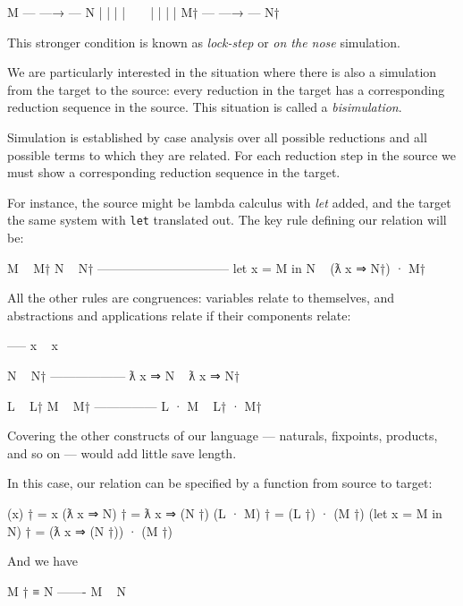 \begin{myDisplay}
M  --- —→ --- N
|             |
|             |
~             ~
|             |
|             |
M† --- —→ --- N†
\end{myDisplay}

This stronger condition is known as \emph{lock-step} or \emph{on the
nose} simulation.

We are particularly interested in the situation where there is also a
simulation from the target to the source: every reduction in the target
has a corresponding reduction sequence in the source. This situation is
called a \emph{bisimulation}.

Simulation is established by case analysis over all possible reductions
and all possible terms to which they are related. For each reduction
step in the source we must show a corresponding reduction sequence in
the target.

For instance, the source might be lambda calculus with \emph{let} added,
and the target the same system with \texttt{let} translated out. The key
rule defining our relation will be:

\begin{myDisplay}
M ~ M†
N ~ N†
--------------------------------
let x = M in N ~ (ƛ x ⇒ N†) · M†
\end{myDisplay}

All the other rules are congruences: variables relate to themselves, and
abstractions and applications relate if their components relate:

\begin{myDisplay}
-----
x ~ x

N ~ N†
------------------
ƛ x ⇒ N ~ ƛ x ⇒ N†

L ~ L†
M ~ M†
---------------
L · M ~ L† · M†
\end{myDisplay}

Covering the other constructs of our language --- naturals, fixpoints,
products, and so on --- would add little save length.

In this case, our relation can be specified by a function from source to
target:

\begin{myDisplay}
(x) †               =  x
(ƛ x ⇒ N) †         =  ƛ x ⇒ (N †)
(L · M) †           =  (L †) · (M †)
(let x = M in N) †  =  (ƛ x ⇒ (N †)) · (M †)
\end{myDisplay}

And we have

\begin{myDisplay}
M † ≡ N
-------
M ~ N
\end{myDisplay}

